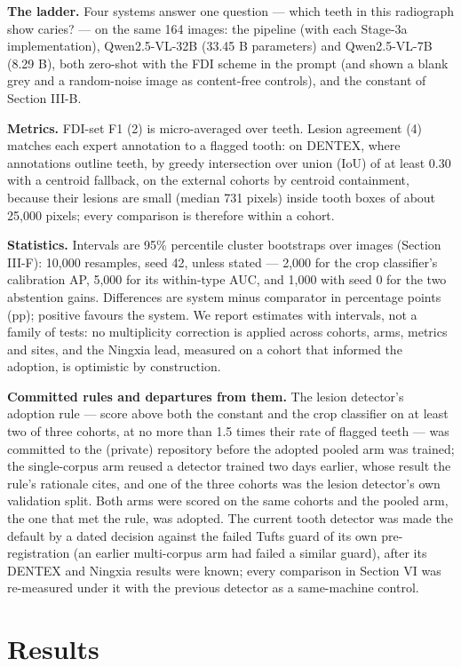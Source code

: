 \documentclass[conference]{IEEEtran}
\begin{document}
\textbf{The ladder.} Four systems answer one question — which teeth in this radiograph show caries? — on the same 164 images: the pipeline (with each Stage-3a implementation), Qwen2.5-VL-32B (33.45 B parameters) and Qwen2.5-VL-7B (8.29 B), both zero-shot with the FDI scheme in the prompt (and shown a blank grey and a random-noise image as content-free controls), and the constant of Section III-B.

\textbf{Metrics.} FDI-set F1 (2) is micro-averaged over teeth. Lesion agreement (4) matches each expert annotation to a flagged tooth: on DENTEX, where annotations outline teeth, by greedy intersection over union (IoU) of at least 0.30 with a centroid fallback, on the external cohorts by centroid containment, because their lesions are small (median 731 pixels) inside tooth boxes of about 25,000 pixels; every comparison is therefore within a cohort.

\textbf{Statistics.} Intervals are 95\% percentile cluster bootstraps over images (Section III-F): 10,000 resamples, seed 42, unless stated — 2,000 for the crop classifier's calibration AP, 5,000 for its within-type AUC, and 1,000 with seed 0 for the two abstention gains. Differences are system minus comparator in percentage points (pp); positive favours the system. We report estimates with intervals, not a family of tests: no multiplicity correction is applied across cohorts, arms, metrics and sites, and the Ningxia lead, measured on a cohort that informed the adoption, is optimistic by construction.

\textbf{Committed rules and departures from them.} The lesion detector's adoption rule — score above both the constant and the crop classifier on at least two of three cohorts, at no more than 1.5 times their rate of flagged teeth — was committed to the (private) repository before the adopted pooled arm was trained; the single-corpus arm reused a detector trained two days earlier, whose result the rule's rationale cites, and one of the three cohorts was the lesion detector's own validation split. Both arms were scored on the same cohorts and the pooled arm, the one that met the rule, was adopted. The current tooth detector was made the default by a dated decision against the failed Tufts guard of its own pre-registration (an earlier multi-corpus arm had failed a similar guard), after its DENTEX and Ningxia results were known; every comparison in Section VI was re-measured under it with the previous detector as a same-machine control.

\section{Results}
\end{document}
